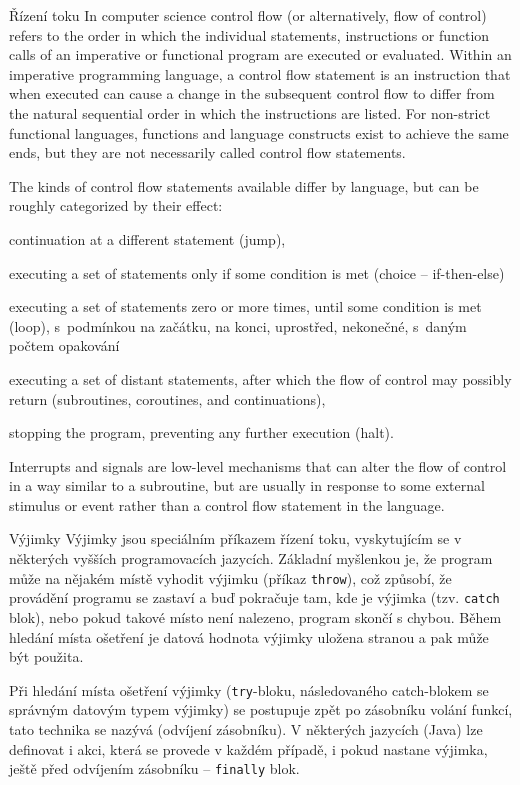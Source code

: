 \begin{obecne}{Řízení toku}
In computer science control flow (or alternatively, flow of control) refers to the order in which the individual statements, instructions or function calls of an imperative or functional program are executed or evaluated. Within an imperative programming language, a control flow statement is an instruction that when executed can cause a change in the subsequent control flow to differ from the natural sequential order in which the instructions are listed. For non-strict functional languages, functions and language constructs exist to achieve the same ends, but they are not necessarily called control flow statements.

The kinds of control flow statements available differ by language, but can be roughly categorized by their effect:
\begin{pitemize}
    \item continuation at a different statement (jump),
    \item executing a set of statements only if some condition is met (choice -- if-then-else)
    \item executing a set of statements zero or more times, until some condition is met (loop), s~podmínkou na začátku, na konci, uprostřed, nekonečné, s~daným počtem opakování
    \item executing a set of distant statements, after which the flow of control may possibly return (subroutines, coroutines, and continuations),
    \item stopping the program, preventing any further execution (halt).
\end{pitemize}
Interrupts and signals are low-level mechanisms that can alter the flow of control in a way similar to a subroutine, but are usually in response to some external stimulus or event rather than a control flow statement in the language. 
\end{obecne}

\begin{obecne}{Výjimky}
Výjimky jsou speciálním příkazem řízení toku, vyskytujícím se v některých vyšších programovacích jazycích. Základní myšlenkou je, že program může na nějakém místě vyhodit výjimku (příkaz \texttt{throw}), což způsobí, že provádění programu se zastaví a buď pokračuje tam, kde je výjimka  (tzv. \texttt{catch} blok), nebo pokud takové místo není nalezeno, program skončí s chybou. Během hledání místa ošetření je datová hodnota výjimky uložena stranou a pak může být použita.

Při hledání místa ošetření výjimky (\texttt{try}-bloku, následovaného catch-blokem se správným datovým typem výjimky) se postupuje zpět po zásobníku volání funkcí, tato technika se nazývá  (odvíjení zásobníku). V některých jazycích (Java) lze definovat i akci, která se provede v každém případě, i pokud nastane výjimka, ještě před odvíjením zásobníku -- \texttt{finally} blok.
\end{obecne}

